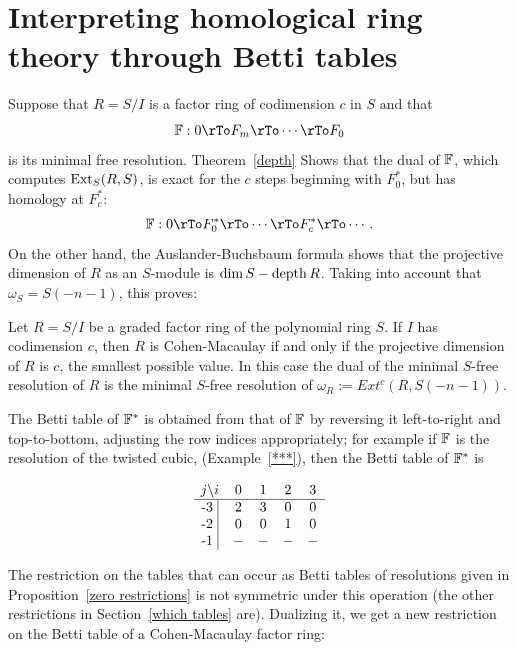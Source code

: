 \section{Interpreting homological ring theory through Betti tables}

Suppose that $R = S/I$ is a  factor ring of codimension $c$ in $S$ and that
$$
\FF: 0 \rTo F_{m} \rTo\cdots\rTo F_{0}
$$ 
is its minimal free resolution. Theorem~\ref{depth} %
Shows that the dual of ${\mathbb F}$, which computes ${\rm{Ext}}_{S}(R,S)$, is exact for the $c$ steps beginning
with $F_{0}^{*}$, but has homology at $F_{c}^{*}$:
$$
\FF: 0 \rTo F_{0}^{*} \rTo\cdots\rTo F_{c}^{*} \rTo\cdots.
$$ 
On the other hand, the Auslander-Buchsbaum formula shows that the projective dimension of $R$
as an $S$-module is $\dim S - \operatorname{depth} R$. Taking into account that $\omega_{S} = S(-n-1)$, this proves:
\begin{proposition}
 Let $R = S/I$ be a graded factor ring of the polynomial ring $S$. If $I$ has codimension $c$, then
 $R$ is Cohen-Macaulay if and only if the projective dimension of $R$ is $c$, the smallest possible value.
 In this case the dual of the minimal $S$-free resolution of $R$ is the minimal $S$-free resolution of
 $\omega_{R} := Ext^{c}(R,S(-n-1))$.
\end{proposition}

The Betti table of ${\mathbb F}^{*}$ is obtained from that of ${\mathbb F}$ by reversing it left-to-right and top-to-bottom, adjusting the row indices appropriately; for example if ${\mathbb F}$ is the resolution of the twisted cubic,
(Example~\ref{***}), then the Betti table of ${\mathbb F}^{*}$ is 
\begin{small}
$$
\begin{matrix}
j \backslash i &0&1&2&3\\ \hline
\text{-3 }\vline &2&3&0&0\\
\text{-2 }\vline &0&0&1&0\\
\text{-1 }\vline &-&-&-&-\\
\end{matrix}
$$
\end{small}

The restriction on the tables that can occur as Betti tables of resolutions given in Proposition~\ref{zero restrictions} is not symmetric under this operation (the other restrictions in Section~\ref{which tables} are). Dualizing it, we get a new restriction on the Betti table of a Cohen-Macaulay factor ring:

